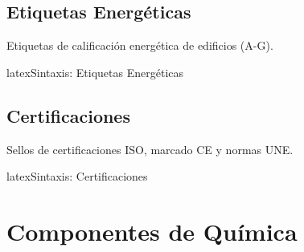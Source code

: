 \begin{controlcalidad}
\end{controlcalidad}

\subsection{Etiquetas Energéticas}
\label{subsec:energia}

Etiquetas de calificación energética de edificios (A-G).

\begin{codigosimple}{latex}{Sintaxis: Etiquetas Energéticas}
\end{codigosimple}

\noindent
{} \quad
{} \quad
{} \quad
{} \quad
{} \quad
{} \quad
{}

\subsection{Certificaciones}
\label{subsec:certificaciones}

Sellos de certificaciones ISO, marcado CE y normas UNE.

\begin{codigosimple}{latex}{Sintaxis: Certificaciones}
\certce             %
\end{codigosimple}

\noindent
{} \quad {} \quad {}

\vspace{0.5em}
\noindent
\certce \quad {}


\section{Componentes de Química}
\label{sec:comp-quimica}

